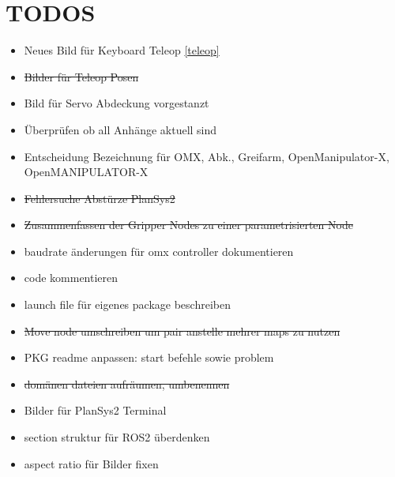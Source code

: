 \section{TODOS}
\begin{itemize}
\item Neues Bild für Keyboard Teleop \ref{teleop}
\item \sout{Bilder für Teleop Posen}
\item Bild für Servo Abdeckung vorgestanzt
\item Überprüfen ob all Anhänge aktuell sind
\item Entscheidung Bezeichnung für OMX, Abk., Greifarm, OpenManipulator-X, OpenMANIPULATOR-X
\item \sout{Fehlersuche Abstürze PlanSys2}
\item \sout{Zusammenfassen der Gripper Nodes zu einer parametrisierten Node}
\item baudrate änderungen für omx controller dokumentieren
\item code kommentieren
\item launch file für eigenes package beschreiben
\item \sout{Move node umschreiben um pair anstelle mehrer maps zu nutzen}
\item PKG readme anpassen: start befehle sowie problem
\item \sout{domänen dateien aufräumen, umbenennen}
\item Bilder für PlanSys2 Terminal
\item section struktur für ROS2 überdenken
    \item aspect ratio für Bilder fixen
\end{itemize}